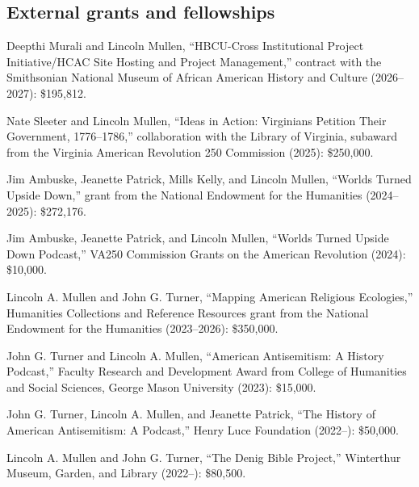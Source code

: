 \documentclass[11pt]{article}
\begin{document}
% 

\subsection{External grants and fellowships}\label{Grants and fellowships}

Deepthi Murali and Lincoln Mullen, ``HBCU-Cross Institutional Project Initiative/HCAC Site Hosting and Project Management,'' contract with the Smithsonian National Museum of African American History and Culture (2026--2027): \$195,812.

Nate Sleeter and Lincoln Mullen, ``Ideas in Action: Virginians Petition Their Government, 1776–1786,'' collaboration with the Library of Virginia, subaward from the Virginia American Revolution 250 Commission (2025): \$250,000.

Jim Ambuske, Jeanette Patrick, Mills Kelly, and Lincoln Mullen, ``Worlds Turned Upside Down,'' grant from the National Endowment for the Humanities (2024--2025): \$272,176.

Jim Ambuske, Jeanette Patrick, and Lincoln Mullen, ``Worlds Turned Upside Down Podcast,'' VA250 Commission Grants on the American Revolution (2024): \$10,000.

Lincoln A. Mullen and John G. Turner, ``Mapping American Religious Ecologies,'' Humanities Collections and Reference Resources grant from the National Endowment for the Humanities (2023--2026): \$350,000.

John G. Turner and Lincoln A. Mullen, ``American Antisemitism: A History Podcast,'' Faculty Research and Development Award from College of Humanities and Social Sciences, George Mason University (2023): \$15,000.

John G. Turner, Lincoln A. Mullen, and Jeanette Patrick, ``The History of American Antisemitism: A Podcast,'' Henry Luce Foundation (2022--): \$50,000.

Lincoln A. Mullen and John G. Turner, ``The Denig Bible Project,'' Winterthur Museum, Garden, and Library (2022--): \$80,500.
\end{document}
